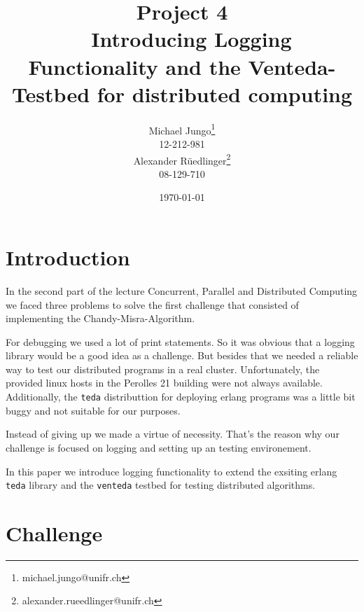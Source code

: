 \documentclass[10pt,a4wide]{article}
\begin{document}
\onehalfspacing 
\begin{titlepage}
\author{Michael Jungo\footnote{michael.jungo@unifr.ch} \\ 12-212-981 \\ Alexander Rüedlinger\footnote{alexander.rueedlinger@unifr.ch} \\ 08-129-710\\ }
\title{Project 4 \\ \ \vspace{0.5em} Introducing Logging Functionality and the Venteda-Testbed for distributed computing }

\date{\today}
\maketitle
\end{titlepage}

\tableofcontents
{} %
\newpage
{} %
\section{Introduction}
In the second part of the lecture Concurrent, Parallel and Distributed Computing we faced three problems to solve the first challenge that consisted of implementing the Chandy-Misra-Algorithm.

For debugging we used a lot of print statements. So it was obvious that a logging library would be a good idea as a challenge. But besides that we needed a reliable way to test our distributed programs in a real cluster. Unfortunately, the provided linux hosts in the Perolles 21 building were not always available. Additionally, the \texttt{teda} distributtion for deploying erlang programs was a little bit buggy and not suitable for our purposes.

Instead of giving up we made a virtue of necessity. That's the reason why our challenge is focused on logging and setting up an testing environement.

In this paper we introduce logging functionality to extend the exsiting erlang \texttt{teda} library and the \texttt{venteda} testbed for testing distributed algorithms.


\section{Challenge}
\end{document}
